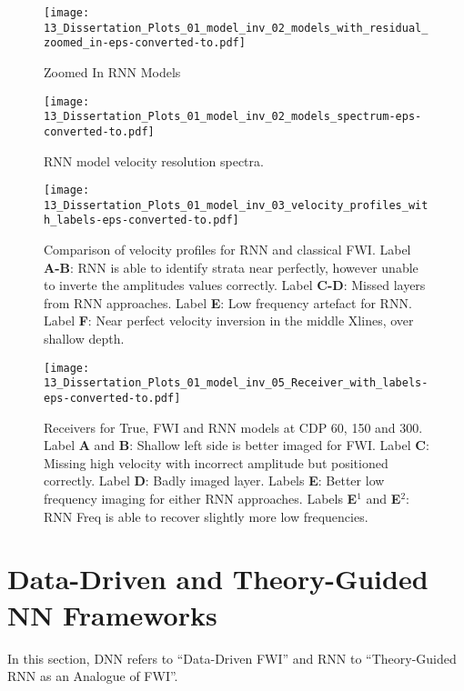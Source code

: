 {\begin{figure}[ht!]
    \centering
    \texttt{[image: 13\_Dissertation\_Plots\_01\_model\_inv\_02\_models\_with\_residual\_zoomed\_in-eps-converted-to.pdf]}
    \caption[Zoomed In RNN Models]{Zoomed In RNN Models}
    \label{fig:rnn_model_zoomed_in}
\end{figure}

\begin{figure}[ht!]
    \centering
    \texttt{[image: 13\_Dissertation\_Plots\_01\_model\_inv\_02\_models\_spectrum-eps-converted-to.pdf]}
    \caption[RNN models velocity resolution spectra]{RNN model velocity resolution spectra.}
    \label{fig:rnn_model_spectra}
\end{figure}

\begin{figure}[ht!]
    \centering
    \texttt{[image: 13\_Dissertation\_Plots\_01\_model\_inv\_03\_velocity\_profiles\_with\_labels-eps-converted-to.pdf]}
    \caption[Velocity profiles for RNN and classical FWI.]{Comparison of velocity profiles for RNN and classical FWI. Label \textbf{A-B}: RNN is able to identify strata near perfectly, however unable to inverte the amplitudes values correctly. Label \textbf{C-D}: Missed layers from RNN approaches. Label \textbf{E}: Low frequency artefact for RNN. Label \textbf{F}: Near perfect velocity inversion in the middle Xlines, over shallow depth.}
    \label{fig:rnn_velocity_profiles}
\end{figure}

\begin{figure}[ht!]
    \centering
    \texttt{[image: 13\_Dissertation\_Plots\_01\_model\_inv\_05\_Receiver\_with\_labels-eps-converted-to.pdf]}
    \caption[Labelled receivers for True, FWI and RNN models.]{Receivers for True, FWI and RNN models at CDP 60, 150 and 300. Label \textbf{A} and \textbf{B}: Shallow left side is better imaged for FWI. Label \textbf{C}: Missing high velocity with incorrect amplitude but positioned correctly. Label \textbf{D}: Badly imaged layer. Labels \textbf{E}: Better low frequency imaging for either RNN approaches. Labels \textbf{E$^{1}$} and \textbf{E$^{2}$}: RNN Freq is able to recover slightly more low frequencies. 
    }
    \label{fig:rnn_receivers}
\end{figure}

\clearpage
\section{Data-Driven and Theory-Guided NN Frameworks}
In this section, DNN refers to ``Data-Driven FWI'' and RNN to ``Theory-Guided RNN as an Analogue of FWI''.

}
